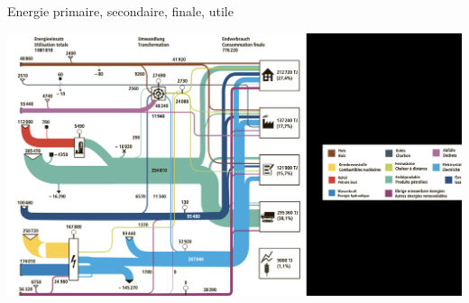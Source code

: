 \begin{parag}{Energie primaire, secondaire, finale, utile}

	\begin{center}
   \includegraphics[scale=0.2]{22025-09-23.png} 
	\end{center}
	
\end{parag}




